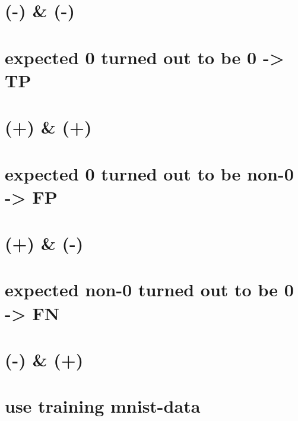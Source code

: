 \documentclass[11pt]{article}
\begin{document}
\section{(-) \& (-)}\label{section}

    \section{expected 0 turned out to be 0 -\textgreater{}
TP}\label{expected-0-turned-out-to-be-0---tp}

\section{(+) \& (+)}\label{section}

    \section{expected 0 turned out to be non-0 -\textgreater{}
FP}\label{expected-0-turned-out-to-be-non-0---fp}

\section{(+) \& (-)}\label{section}

    \section{expected non-0 turned out to be 0 -\textgreater{}
FN}\label{expected-non-0-turned-out-to-be-0---fn}

\section{(-) \& (+)}\label{section}

    \section{use training mnist-data}\label{use-training-mnist-data}
\end{document}
